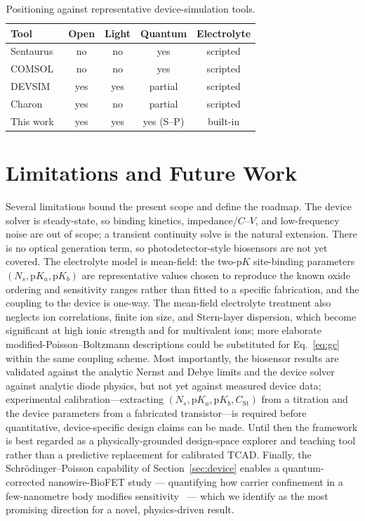 \documentclass[10pt,journal]{IEEEtran}
\begin{document}
\begin{table}[t]
\centering
\caption{Positioning against representative device-simulation tools.}
\label{tab:tools}
\footnotesize
\renewcommand{\arraystretch}{1.25}
\begin{tabular}{@{}p{1.7cm}cccc@{}}
\toprule
Tool & Open & Light & Quantum & Electrolyte \\
\midrule
Sentaurus~\cite{sentaurus} & no & no & yes & scripted \\
COMSOL~\cite{comsol} & no & no & yes & scripted \\
DEVSIM~\cite{sanchez2016} & yes & yes & partial & scripted \\
Charon~\cite{charon2020} & yes & no & partial & scripted \\
This work & yes & yes & yes (S--P) & built-in \\
\bottomrule
\end{tabular}
\end{table}

\section{Limitations and Future Work}
\label{sec:future}

Several limitations bound the present scope and define the roadmap. The device
solver is steady-state, so binding kinetics, impedance/$C$--$V$, and
low-frequency noise are out of scope; a transient continuity solve is the natural
extension. There is no optical generation term, so photodetector-style biosensors
are not yet covered. The electrolyte model is mean-field: the two-p$K$
site-binding parameters $(N_s,\mathrm{p}K_a,\mathrm{p}K_b)$ are representative
values chosen to reproduce the known oxide ordering and sensitivity ranges rather
than fitted to a specific fabrication, and the coupling to the device is one-way.
The mean-field electrolyte treatment also neglects ion correlations, finite ion
size, and Stern-layer dispersion, which become significant at high ionic strength
and for multivalent ions; more elaborate modified-Poisson--Boltzmann descriptions
could be substituted for Eq.~\eqref{eq:gc} within the same coupling scheme.
Most importantly, the biosensor results are validated against the analytic
Nernst and Debye limits and the device solver against analytic diode physics, but
not yet against measured device data; experimental calibration---extracting
$(N_s,\mathrm{p}K_a,\mathrm{p}K_b,C_{\mathrm{St}})$ from a titration and the
device parameters from a fabricated transistor---is required before quantitative,
device-specific design claims can be made. Until then the framework is best
regarded as a physically-grounded design-space explorer and teaching tool rather
than a predictive replacement for calibrated TCAD. Finally, the
Schr\"odinger--Poisson capability of Section~\ref{sec:device} enables a
quantum-corrected nanowire-BioFET study --- quantifying how carrier confinement in
a few-nanometre body modifies sensitivity~\cite{nair2007,stern1972} --- which we
identify as the most promising direction for a novel, physics-driven result.
\end{document}
